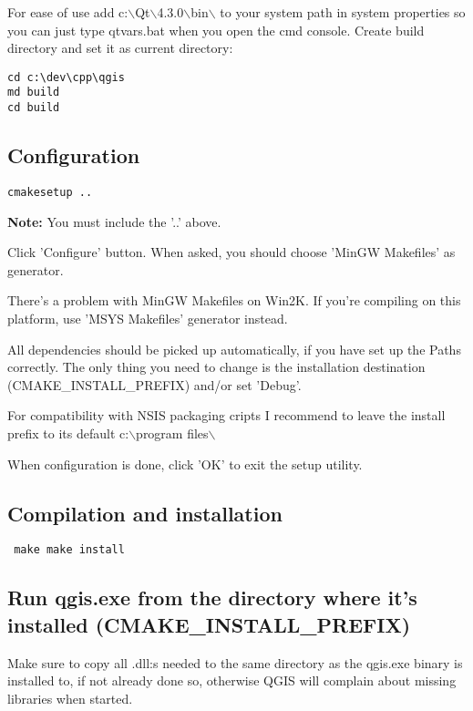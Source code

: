 For ease of use add c:$\backslash$Qt$\backslash$4.3.0$\backslash$bin$\backslash$ to your system path in system
properties so you can just type qtvars.bat when you open the cmd console.
Create build directory and set it as current directory:

\begin{verbatim}
cd c:\dev\cpp\qgis 
md build 
cd build 
\end{verbatim}

\subsection{Configuration}
\begin{verbatim}
cmakesetup ..  
\end{verbatim}

\textbf{Note:} You must include the '..' above.

Click 'Configure' button.  When asked, you should choose 'MinGW Makefiles' as generator.

There's a problem with MinGW Makefiles on Win2K. If you're compiling on this platform, use 'MSYS Makefiles' generator instead.

All dependencies should be picked up automatically, if you have set up the Paths correctly. The only thing you need to change is the installation destination (CMAKE\_INSTALL\_PREFIX) and/or set 'Debug'.

For compatibility with NSIS packaging cripts I recommend to leave the
install prefix to its default c:$\backslash$program files$\backslash$

When configuration is done, click 'OK' to exit the setup utility.

\subsection{Compilation and installation}
\begin{verbatim}
 make make install 
\end{verbatim}

\subsection{Run qgis.exe from the directory where it's installed (CMAKE\_INSTALL\_PREFIX)}
Make sure to copy all .dll:s needed to the same directory as the qgis.exe
binary is installed to, if not already done so, otherwise QGIS will complain
about missing libraries when started.

